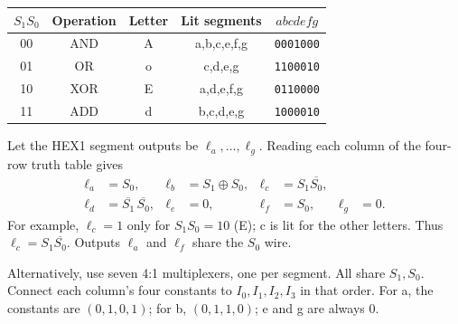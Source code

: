 \documentclass[a4paper,11pt]{article}
\begin{document}
\begin{center}\small
\begin{tabular}{ccccc}
\toprule
$S_1S_0$ & Operation & Letter & Lit segments & $abcdefg$\\\midrule
00 & AND & A & a,b,c,e,f,g & \texttt{0001000}\\
01 & OR & o & c,d,e,g & \texttt{1100010}\\
10 & XOR & E & a,d,e,f,g & \texttt{0110000}\\
11 & ADD & d & b,c,d,e,g & \texttt{1000010}\\
\bottomrule\end{tabular}\end{center}


Let the HEX1 segment outputs be $\ell_a,\ldots,\ell_g$. Reading each column
of the four-row truth table gives
\begin{align*}
\ell_a&=S_0,&\ell_b&=S_1\oplus S_0,&\ell_c&=S_1\overline{S_0},\\
\ell_d&=\overline{S_1}\,\overline{S_0},&\ell_e&=0,&\ell_f&=S_0,&\ell_g&=0.
\end{align*}
For example, $\ell_c=1$ only for $S_1S_0=10$ (E); c is lit for the other letters.
Thus $\ell_c=S_1\overline{S_0}$. Outputs $\ell_a$ and $\ell_f$ share the $S_0$ wire.


\begin{center}\end{center}

Alternatively, use seven 4:1 multiplexers, one per segment. All share
$S_1,S_0$. Connect each column's four constants to $I_0,I_1,I_2,I_3$ in that order.
For a, the constants are $(0,1,0,1)$; for b, $(0,1,1,0)$; e and g are always 0.
\end{document}

